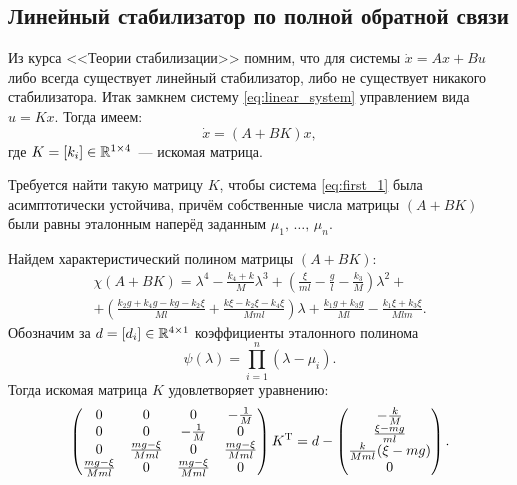 \subsection{Линейный стабилизатор по полной обратной связи}

Из курса <<Теории стабилизации>> помним, что для системы $\dot x = Ax + Bu$ либо всегда существует линейный стабилизатор, либо не существует никакого стабилизатора.
Итак замкнем систему \eqref{eq:linear_system} управлением вида $u = Kx$.
Тогда имеем:
\begin{equation}\label{eq:first_1}
	\dot x = (A + BK)x,
\end{equation}
где $K = [k_{i}] \in \mathbb{R}^{1 \times 4}$~--- искомая матрица.

Требуется найти такую матрицу $K$, чтобы система \eqref{eq:first_1} была асимптотически устойчива, причём собственные числа матрицы $(A+BK)$ были равны эталонным наперёд заданным $\mu_1,\,\ldots,\,\mu_n$.

Найдем характеристический полином матрицы $(A + BK)$:
\begin{multline}
	\chi(A + BK)
	=
	\lambda^4
	-\frac{k_4 + k}{M}\lambda^3
	+\left(
		\frac{\xi}{ml}
		-
		\frac{g}{l}
		-
		\frac{k_3}{M}
	\right)
	\lambda^2
	+
	\\
	+\left(
		\frac{k_2 g + k_4 g - kg - k_2\xi}{Ml}
		+
		\frac{k\xi - k_2\xi - k_4\xi}{Mml}
	\right)
	\lambda
	 + \frac{k_1g + k_3g}{Ml} - \frac{k_1\xi + k_3\xi}{Mlm}.
\end{multline}
Обозначим за $d = [d_i] \in \mathbb{R}^{4 \times 1}$ коэффициенты эталонного полинома
$$
	\psi(\lambda) = \prod_{i = 1}^{n} (\lambda - \mu_i).
$$
Тогда искомая матрица $K$ удовлетворяет уравнению:
$$
\begin{pmatrix}
0 & 0 & 0 & -\frac{1}{M} \\
0 & 0 & -\frac{1}{M} & 0 \\
0 & \frac{mg - \xi}{Mml} & 0 & \frac{mg - \xi}{Mml} \\
\frac{mg - \xi}{Mml} & 0 & \frac{mg - \xi}{Mml} & 0
\end{pmatrix}
K^\mathrm{T}
=
d
-
\begin{pmatrix}
- \frac{k}{M} \\ \frac{\xi - mg}{ml} \\ \frac{k}{Mml}(\xi - mg) \\ 0
\end{pmatrix}.
$$